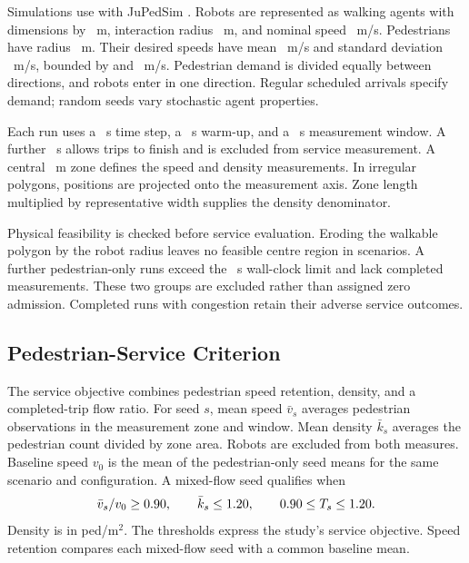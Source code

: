 \documentclass[NewProceedings,letterpaper]{ascelike-new}
\begin{document}
Simulations use \EngineVersion{} with JuPedSim \cite{Lopez2018}. Robots are represented as walking agents with dimensions \RobotLength{} by \RobotWidth{}~m, interaction radius \RobotRadius{}~m, and nominal speed \RobotSpeed{}~m/s. Pedestrians have radius \PedRadius{}~m. Their desired speeds have mean \PedSpeed{}~m/s and standard deviation \PedSD{}~m/s, bounded by \PedMin{} and \PedMax{}~m/s. Pedestrian demand is divided equally between directions, and robots enter in one direction. Regular scheduled arrivals specify demand; random seeds vary stochastic agent properties.

Each run uses a \TimeStep{}~s time step, a \Warmup{}~s warm-up, and a \Measurement{}~s measurement window. A further \Tail{}~s allows trips to finish and is excluded from service measurement. A central \ZoneLength{}~m zone defines the speed and density measurements. In irregular polygons, positions are projected onto the measurement axis. Zone length multiplied by representative width supplies the density denominator.

Physical feasibility is checked before service evaluation. Eroding the walkable polygon by the robot radius leaves no feasible centre region in \GeometryExcluded{} scenarios. A further \TechnicalExcluded{} pedestrian-only runs exceed the \Timeout{}~s wall-clock limit and lack completed measurements. These two groups are excluded rather than assigned zero admission. Completed runs with congestion retain their adverse service outcomes.

\subsection{Pedestrian-Service Criterion}
The service objective combines pedestrian speed retention, density, and a completed-trip flow ratio. For seed $s$, mean speed $\bar v_s$ averages pedestrian observations in the measurement zone and window. Mean density $\bar k_s$ averages the pedestrian count divided by zone area. Robots are excluded from both measures. Baseline speed $v_0$ is the mean of the pedestrian-only seed means for the same scenario and configuration. A mixed-flow seed qualifies when
\begin{equation}
 \bar v_s/v_0\geq0.90{},\qquad
 \bar k_s\leq1.20{},\qquad
 0.90{}\leq T_s\leq1.20{}.
 \label{eq:service}
\end{equation}
Density is in ped/m$^2$. The thresholds express the study's service objective. Speed retention compares each mixed-flow seed with a common baseline mean.
\end{document}
